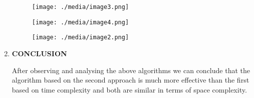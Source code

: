 \begin{multicols}{2}
\begin{enumerate}
\begin{figure}[H]
	\begin{Center}
		\texttt{[image: ./media/image3.png]}
	\end{Center}
\end{figure}



\par


\vspace{\baselineskip}



\begin{figure}[H]
	\begin{Center}
		\texttt{[image: ./media/image4.png]}
	\end{Center}
\end{figure}



\par


\vspace{\baselineskip}



\begin{figure}[H]
	\begin{Center}
		\texttt{[image: ./media/image2.png]}
	\end{Center}
\end{figure}



\par


\vspace{\baselineskip}

\vspace{\baselineskip}
	\item \textbf{CONCLUSION}\par

After observing and analysing the above algorithms we can conclude that the algorithm based on the second approach is much more effective than the first based on time complexity and both are similar in terms of space complexity.\par



\end{enumerate}
\end{multicols}

